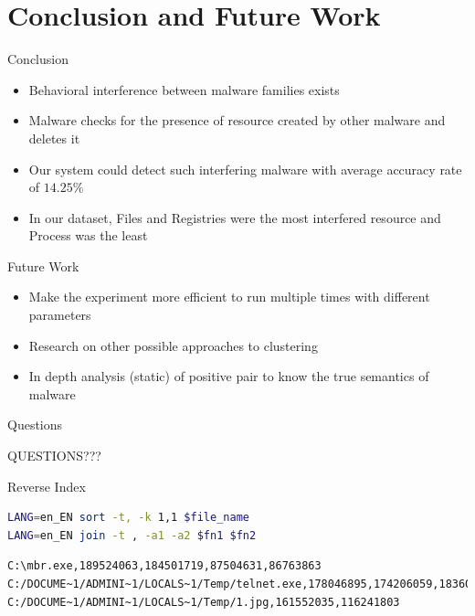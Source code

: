 \documentclass{beamer}
\begin{document}
\section{Conclusion and Future Work}
\begin{frame}{Conclusion}
  \begin{itemize}
    \item Behavioral interference between malware families exists
    \item Malware checks for the presence of resource created by other malware and deletes it
    \item Our system could detect such interfering malware with average accuracy rate of $14.25\%$
    \item In our dataset, Files and Registries were the most interfered resource and Process was the least
  \end{itemize}
\end{frame}
\begin{frame}{Future Work}
  \begin{itemize}
    \item Make the experiment more efficient to run multiple times with different parameters
    \item Research on other possible approaches to clustering
    \item In depth analysis (static) of positive pair to know the true semantics of malware
  \end{itemize}
\end{frame}
\begin{frame}[plain,c]{Questions}
  \begin{center}
    \Huge QUESTIONS???
  \end{center}
\end{frame}
\appendix
\begin{frame}{Reverse Index}
\begin{lstlisting}[numbers=none,language=bash,caption={Sort and join the reverse index}]
LANG=en_EN sort -t, -k 1,1 $file_name
LANG=en_EN join -t , -a1 -a2 $fn1 $fn2
\end{lstlisting}
\begin{lstlisting}[numbers=none,caption={Sample of reverse index created for File activity},label={lst:reverseindex}]
C:\mbr.exe,189524063,184501719,87504631,86763863
C:/DOCUME~1/ADMINI~1/LOCALS~1/Temp/telnet.exe,178046895,174206059,183601891,89650247
C:/DOCUME~1/ADMINI~1/LOCALS~1/Temp/1.jpg,161552035,116241803
\end{lstlisting}
\end{frame}
\end{document}
